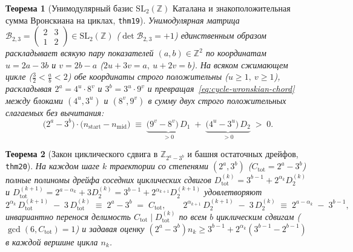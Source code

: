\documentclass[11pt,a4paper]{article}
\newtheorem{theorem}{Теорема}[section]
\theoremstyle{definition}
\theoremstyle{remark}
\begin{document}
\begin{theorem}[Унимодулярный базис $\mathrm{SL}_2(\mathbb{Z})$ Каталана и знакоположительная сумма Вронскиана на циклах, \texttt{thm19}]
\label{thm:catalan-sl2-basis}
Унимодулярная матрица $\mathcal{B}_{2,3} = \begin{pmatrix} 2 & 3 \\ 1 & 2 \end{pmatrix} \in \mathrm{SL}_2(\mathbb{Z})$ ($\det\mathcal{B}_{2,3} = +1$) единственным образом раскладывает всякую пару показателей $(a,b)\in\mathbb{Z}^2$ по координатам $u = 2a - 3b$ и $v = 2b - a$ ($2u + 3v = a,\ u + 2v = b$). На всяком сжимающем цикле ($\frac{3}{2} < \frac{a}{b} < 2$) обе координаты строго положительны ($u \ge 1,\ v \ge 1$), раскладывая $2^a = 4^u\cdot 8^v$ и $3^b = 3^u\cdot 9^v$ и превращая~\eqref{eq:cycle-wronskian-chord} между блоками $(4^u,3^u)$ и $(8^v,9^v)$ в сумму двух строго положительных слагаемых без вычитания:
\begin{equation}
  \label{eq:positive-wronskian-sum}
  \bigl(2^a - 3^b\bigr)\cdot\bigl(n_{\mathrm{start}} - n_{\mathrm{mid}}\bigr) \;\equiv\; \underbrace{\bigl(9^v - 8^v\bigr)\,D_1}_{> 0} \;+\; \underbrace{\bigl(4^u - 3^u\bigr)\,D_2}_{> 0} \;>\; 0.
\end{equation}
\end{theorem}

\begin{theorem}[Закон циклического сдвига в $\mathbb{Z}_{2^a - 3^b}$ и башня остаточных дрейфов, \texttt{thm20}]
\label{thm:dual-drift-tower}
На каждом шаге $k$ траектории со степенями $(2^a, 3^b)$ ($C_{\mathrm{tot}} = 2^a - 3^b$) полные полиномы дрейфа соседних циклических сдвигов $D_{\mathrm{tot}}^{(k)} = 3^{b-1} + 2^{\alpha_k} D_2^{(k)}$ и $D_{\mathrm{tot}}^{(k+1)} = 2^{a - \alpha_k} + 3 D_2^{(k)} = 3^{b-1} + 2^{\alpha_{k+1}} D_2^{(k+1)}$ удовлетворяют
\begin{equation}
  \label{eq:cyclic-drift-shift}
  2^{\alpha_k}\,D_{\mathrm{tot}}^{(k+1)} \;-\; 3\,D_{\mathrm{tot}}^{(k)} \;\equiv\; 2^a - 3^b \;=\; C_{\mathrm{tot}}, \qquad
  2^{\alpha_{k+1}}\,D_2^{(k+1)} \;-\; 3\,D_2^{(k)} \;\equiv\; 2^{a - \alpha_k} \;-\; 3^{b-1},
\end{equation}
инвариантно перенося делимость $C_{\mathrm{tot}} \mid D_{\mathrm{tot}}^{(k)}$ по всем $b$ циклическим сдвигам ($\gcd(6, C_{\mathrm{tot}}) = 1$) и задавая оценку $(2^a - 3^b) n_k \ge 3^{b-1} + 2^{\alpha_k}(3^{b-1} - 2^{b-1})$ в каждой вершине цикла $n_k$.
\end{theorem}
\end{document}
